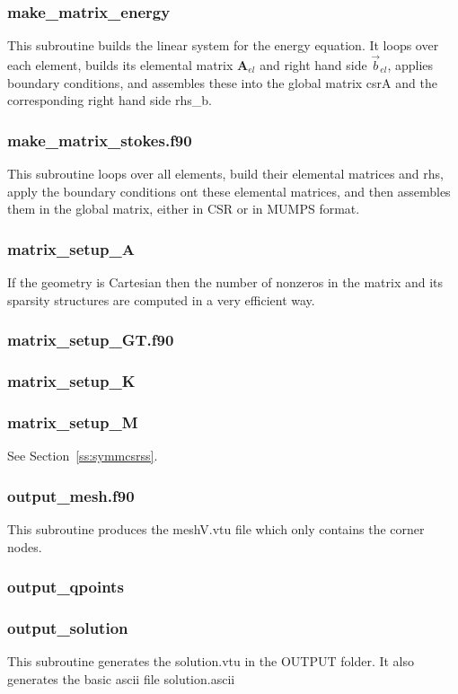  \subsubsection{make\_matrix\_energy}
 This subroutine builds the linear system for the energy equation. 
 It loops over each element, builds its elemental matrix ${\bm A}_{el}$
 and right hand side $\vec{b}_{el}$, applies boundary conditions, 
 and assembles these into the global matrix csrA and the corresponding 
 right hand side rhs\_b. 
 \subsubsection{make\_matrix\_stokes.f90}
 This subroutine loops over all elements, build their elemental matrices and rhs, 
 apply the boundary conditions ont these elemental matrices, and then 
 assembles them in the global matrix, either in CSR or in MUMPS format.
 \subsubsection{matrix\_setup\_A}
 If the geometry is Cartesian then the number of nonzeros in the matrix and its sparsity 
 structures are computed in a very efficient way. 
 \subsubsection{matrix\_setup\_GT.f90}

 \subsubsection{matrix\_setup\_K}

 \subsubsection{matrix\_setup\_M}
 See Section~\ref{ss:symmcsrss}. 
 \subsubsection{output\_mesh.f90}
 This subroutine produces the {\filenamefont meshV.vtu} file which only 
 contains the corner nodes.
 \subsubsection{output\_qpoints}

 \subsubsection{output\_solution}
 This subroutine generates the {\filenamefont solution.vtu} in the {\foldernamefont OUTPUT}
 folder. It also generates the basic ascii file {\filenamefont solution.ascii}
